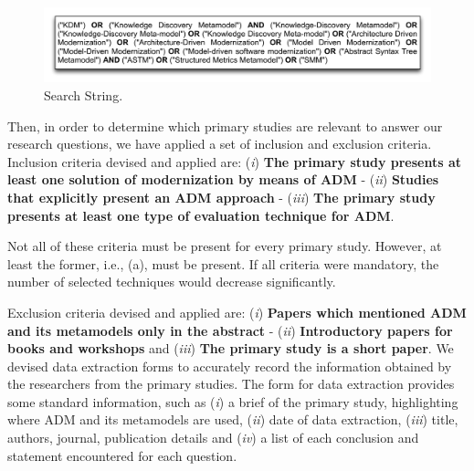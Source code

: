 \begin{figure}[!h]
\centering
  \includegraphics[scale=0.35]{figuras/SearchStringADM}
\caption{Search String.}
\label{search_string}
\end{figure} 

Then, in order to determine which primary studies are relevant to answer our research questions, we have applied a set of inclusion and exclusion criteria. Inclusion criteria devised and applied are: (\textit{i}) \textbf{The primary study presents at least one solution of modernization by means of ADM} - (\textit{ii}) \textbf{Studies that explicitly present an ADM approach} - (\textit{iii}) \textbf{The primary study presents at least one type of evaluation technique for ADM}. 



Not all of these criteria must be present for every primary study. However, at least the former, i.e., (a), must be present. If all criteria were mandatory, the number of selected techniques would decrease significantly.

Exclusion criteria devised and applied are: (\textit{i}) \textbf{Papers which mentioned ADM and its metamodels only in the abstract} - (\textit{ii}) \textbf{Introductory papers for books and workshops} and (\textit{iii}) \textbf{The primary study is a short paper}. We devised data extraction forms to accurately record the information obtained by the researchers from the primary studies. The form for data extraction provides some standard information, such as (\textit{i}) a brief of the primary study, highlighting where ADM and its metamodels are used, (\textit{ii}) date of data extraction, (\textit{iii}) title, authors, journal, publication details and (\textit{iv}) a list of each conclusion and statement encountered for each question. 

